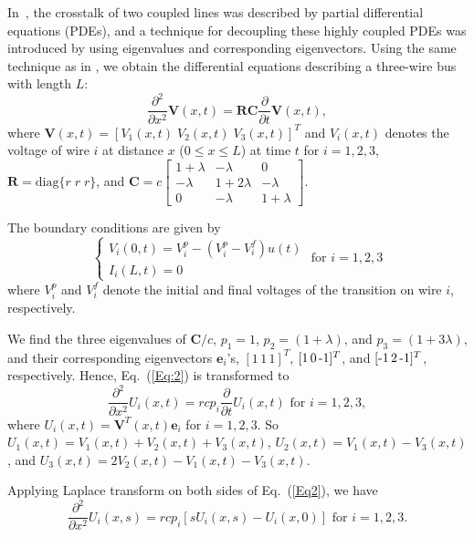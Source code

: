 \documentclass[10pt,journal]{IEEEtran}
\begin{document}
In~\cite{Sak93}, the crosstalk of two coupled lines was described by partial differential equations (PDEs), and a technique for decoupling these highly coupled PDEs was introduced by using eigenvalues and corresponding eigenvectors.
Using the same technique as in \cite{Sak93}, we obtain the differential equations describing a three-wire bus with length $L$:
\begin{equation}
\frac{\partial^2}{\partial x^2}\mathbf{V}(x,t)
=\mathbf{RC}\frac{\partial}{\partial t}\mathbf{V}(x,t),
\label{Eq:2}
\end{equation}
where $\mathbf{V}(x,t)=[V_1(x,t)\;V_2(x,t)\;V_3(x,t)]^T$ and $V_i(x,t)$ denotes the voltage of wire $i$ at distance $x$ ($0\le x \le L$) at time $t$ for $i=1,2,3$,
$\mathbf{R}=\mbox{diag}\{r \; r \; r\}$, and $\mathbf{C}=c\left[ \begin{array}{ccc} 1+\lambda & -\lambda & 0 \\ -\lambda & 1+2\lambda & -\lambda\\
0 & -\lambda & 1+\lambda \end{array}\right]$.


The boundary conditions are given by
\begin{equation*}
\left\{ \begin{array}{l}
V_i(0,t)=V_i^p-(V_i^p-V_i^f) u(t) \\
I_i(L,t)=0
\end{array} \mbox{ for } i=1,2,3 \right.
\end{equation*}
where $V^p_i$ and $V^f_i$ denote the initial and final voltages of the transition on wire $i$, respectively.


We find the three eigenvalues of $\mathbf{C}/c$, $p_1=1$, $p_2=(1+\lambda)$, and $p_3=(1+3\lambda)$, and their corresponding eigenvectors $\mathbf{e}_i$'s, $[1 \, 1 \, 1]^T$, $[1 \, 0 \, \textnormal{-}1]^T$, and $[\textnormal{-}1 \, 2 \, \textnormal{-}1]^T$, respectively. Hence, Eq.~(\ref{Eq:2}) is transformed to
\begin{equation}
\frac{\partial^2}{\partial x^2}U_i(x,t)=rcp_i\frac{\partial}{\partial t} U_i(x,t) \mbox{ for }i=1,2,3,\label{Eq2}
\end{equation}
where $U_i(x,t)=\mathbf{V}^T(x,t) \mathbf{e}_i$ for $i=1,2,3$. So $U_1(x,t)=V_1(x,t)+ V_2(x,t) + V_3(x,t)$, $U_2(x,t)=V_1(x,t)-V_3(x,t)$, and $U_3(x,t)=2V_2(x,t)-V_1(x,t)-V_3(x,t)$.

Applying Laplace transform on both sides of Eq.~(\ref{Eq2}), we have
\begin{equation}
\frac{\partial^2}{\partial x^2}U_i(x,s)=rcp_i[s U_i(x,s) - U_i(x,0)] \mbox{ for }i=1,2,3. \label{Eq1}
\end{equation}
\end{document}
